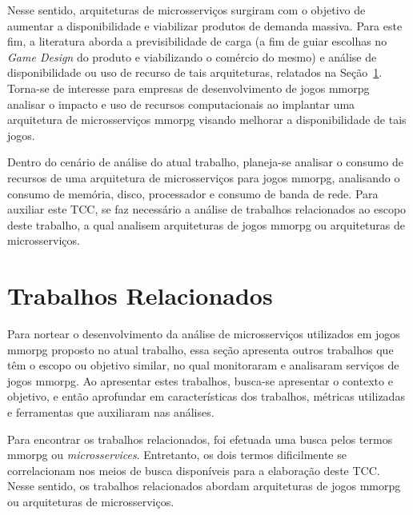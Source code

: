 Nesse sentido, arquiteturas de microsserviços surgiram com o objetivo de aumentar a disponibilidade e viabilizar produtos de demanda massiva. %
%
Para este fim, a literatura aborda a previsibilidade de carga (a fim de guiar escolhas no \textit{Game Design} do produto e viabilizando o comércio do mesmo) e análise de disponibilidade ou uso de recurso de tais arquiteturas, relatados na Seção~\ref{sec:similares}.
%
Torna-se de interesse para empresas de desenvolvimento de jogos \ac{mmorpg} analisar o impacto e uso de recursos computacionais ao implantar uma arquitetura de microsserviços \ac{mmorpg} visando melhorar a disponibilidade de tais jogos.



Dentro do cenário de análise do atual trabalho, planeja-se analisar o consumo de recursos de uma arquitetura de microsserviços para jogos \ac{mmorpg}, analisando o consumo de memória, disco, processador e consumo de banda de rede.
%
Para auxiliar este TCC, se faz necessário a análise de trabalhos relacionados ao escopo deste trabalho, a qual analisem arquiteturas de jogos \ac{mmorpg} ou arquiteturas de microsserviços.

\section{Trabalhos Relacionados}
\label{sec:similares}



Para nortear o desenvolvimento da análise de microsserviços utilizados em jogos \ac{mmorpg} proposto no atual trabalho, essa seção apresenta outros trabalhos que têm o escopo ou objetivo similar, no qual monitoraram e analisaram serviços de jogos \ac{mmorpg}.
%
Ao apresentar estes trabalhos, busca-se apresentar o contexto e objetivo, e então aprofundar em características dos trabalhos, métricas utilizadas e ferramentas que auxiliaram nas análises.
%

Para encontrar os trabalhos relacionados, foi efetuada uma busca pelos termos \ac{mmorpg} ou \textit{microsservices}.
%
Entretanto, os dois termos dificilmente se correlacionam nos meios de busca disponíveis para a elaboração deste TCC.
%
Nesse sentido, os trabalhos relacionados abordam arquiteturas de jogos \ac{mmorpg} ou arquiteturas de microsserviços.



